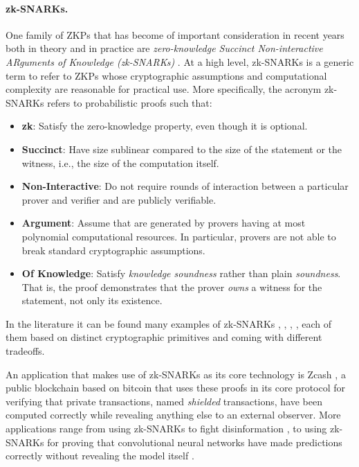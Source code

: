 \paragraph*{zk-SNARKs.}
One family of ZKPs that has become of important consideration in recent years both in theory and in practice are \textit{zero-knowledge Succinct Non-interactive ARguments of Knowledge (zk-SNARKs)} \cite{EPRINT:BCCT11}. At a high level, zk-SNARKs is a generic term to refer to ZKPs whose cryptographic assumptions and computational complexity are reasonable for practical use. More specifically, the acronym zk-SNARKs refers to probabilistic proofs such that:
\begin{itemize}
	\item \textbf{zk}: Satisfy the zero-knowledge property, even though it is optional.
	\item \textbf{Succinct}: Have size sublinear compared to the size of the statement or the witness, i.e., the size of the computation itself.
	\item \textbf{Non-Interactive}: Do not require rounds of interaction between a particular prover and verifier and are publicly verifiable.
	\item \textbf{Argument}: Assume that are generated by provers having at most polynomial computational resources. In particular, provers are not able to break standard cryptographic assumptions.
	\item \textbf{Of Knowledge}: Satisfy \textit{knowledge soundness} rather than plain \textit{soundness}. That is, the proof demonstrates that the prover \textit{owns} a witness for the statement, not only its existence.
\end{itemize}

In the literature it can be found many examples of zk-SNARKs \cite{EPRINT:Groth16}, \cite{SP:BBBPWM18}, \cite{EPRINT:GabWilCio19}, \cite{EPRINT:CHMMVW19}, each of them based on distinct cryptographic primitives and coming with different tradeoffs.

An application that makes use of zk-SNARKs as its core technology is Zcash \cite{Wilcox2016ZcashPS}, a public blockchain based on bitcoin that uses these proofs in its core protocol for verifying that private transactions, named \textit{shielded} transactions, have been computed correctly while revealing anything else to an external observer. 
More applications range from using zk-SNARKs to fight disinformation \cite{Yi2022}, to using zk-SNARKs for proving that convolutional neural networks have made predictions correctly without revealing the model itself \cite{EPRINT:LiuXieZha21}.


